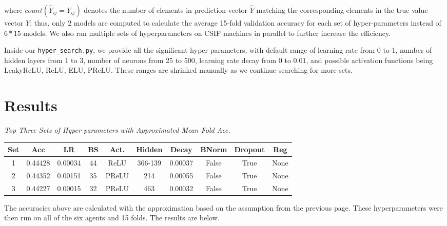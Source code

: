 \documentclass[10pt]{article}
\begin{document}
  where $count(\hat{Y}_{ij}=Y_{ij})$ denotes the number of elements in prediction vector $\hat{Y}$ matching the corresponding elements in the true value vector $Y$; thus, only 2 models are computed to calculate the average 15-fold validation accuracy for each set of hyper-parameters instead of $6 * 15$ models. We also ran multiple sets of hyperparameters on CSIF machines in parallel to further increase the efficiency.

  \quad Inside our \texttt{hyper\_search.py}, we provide all the significant hyper parameters, with default range of learning rate from 0 to 1, number of hidden layers from 1 to 3, number of neurons from 25 to 500, learning rate decay from 0 to 0.01, and possible activation functions being LeakyReLU, ReLU, ELU, PReLU. These ranges are shrinked manually as we continue searching for more sets.

\section{Results}

  \begin{center}
    \textit{Top Three Sets of Hyper-parameters with Approximated Mean Fold Acc.}
    \scriptsize
    \begin{tabular}{| c | c | c | c | c | c | c | c | c | c |}
      \hline
      Set & Acc & LR & BS & Act. & Hidden & Decay & BNorm & Dropout & Reg \\
      \hline
      1 & 0.44428  &  0.00034 & 44 & ReLU  & 366-139 & 0.00037 & False & True & None \\
      2 & 0.44352  &  0.00151 & 35 & PReLU & 214     & 0.00055 & False & True & None \\
      3 & 0.44227  &  0.00015 & 32 & PReLU & 463     & 0.00032 & False & True & None \\
      \hline
    \end{tabular}
    \normalsize
  \end{center}

  \quad The accuracies above are calculated with the approximation based on the assumption from the previous page. These hyperparameters were then run on all of the six agents and 15 folds. The results are below.
\end{document}
